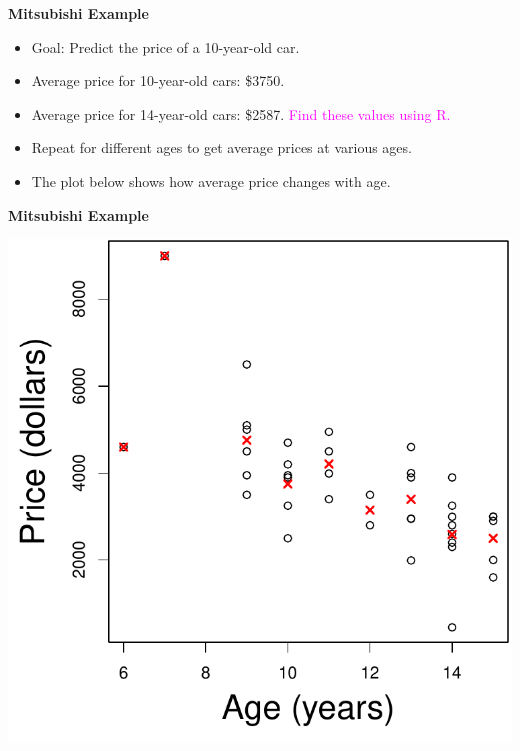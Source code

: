 \documentclass[landscape]{slides}
\newcommand{\heading}[1]{%
  \begin{center}
    \large\bf \color{red}
        #1
  \end{center}
  \vspace{1ex minus 1ex}}
\begin{document}
\begin{slide}
	\heading{Mitsubishi Example}
	
	\begin{itemize}
		\item Goal: Predict the price of a 10-year-old car.
		\item Average price for 10-year-old cars: \$3750.
		\item Average price for 14-year-old cars: \$2587. \textcolor{magenta}{Find these values using R.}
		
		\item Repeat for different ages to get average prices at various ages.
		\item The plot below shows how average price changes with age.
		
	\end{itemize}
	
\end{slide}

\begin{slide}
\heading{Mitsubishi Example}

\begin{center}
\includegraphics{figures/7-LinearModels-Figures/agepricex.pdf}
\end{center}
\end{slide}
\end{document}
